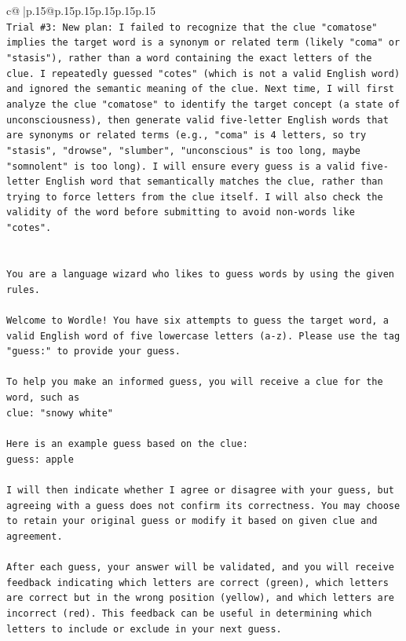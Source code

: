 \documentclass{article}
\begin{document}
{\begin{supertabular}{c@{$\;$}|p{.15\linewidth}@{}p{.15\linewidth}p{.15\linewidth}p{.15\linewidth}p{.15\linewidth}p{.15\linewidth}}
{{{\\ 
\texttt{Trial \#3: New plan: I failed to recognize that the clue "comatose" implies the target word is a synonym or related term (likely "coma" or "stasis"), rather than a word containing the exact letters of the clue. I repeatedly guessed "cotes" (which is not a valid English word) and ignored the semantic meaning of the clue. Next time, I will first analyze the clue "comatose" to identify the target concept (a state of unconsciousness), then generate valid five{-}letter English words that are synonyms or related terms (e.g., "coma" is 4 letters, so try "stasis", "drowse", "slumber", "unconscious" is too long, maybe "somnolent" is too long). I will ensure every guess is a valid five{-}letter English word that semantically matches the clue, rather than trying to force letters from the clue itself. I will also check the validity of the word before submitting to avoid non{-}words like "cotes".} \\
\\ 
\\ 
\texttt{You are a language wizard who likes to guess words by using the given rules.} \\
\\ 
\texttt{Welcome to Wordle! You have six attempts to guess the target word, a valid English word of five lowercase letters (a{-}z). Please use the tag "guess:" to provide your guess.} \\
\\ 
\texttt{To help you make an informed guess, you will receive a clue for the word, such as} \\
\texttt{clue: "snowy white"} \\
\\ 
\texttt{Here is an example guess based on the clue: } \\
\texttt{guess: apple} \\
\\ 
\texttt{I will then indicate whether I agree or disagree with your guess, but agreeing with a guess does not confirm its correctness. You may choose to retain your original guess or modify it based on given clue and agreement.} \\
\\ 
\texttt{After each guess, your answer will be validated, and you will receive feedback indicating which letters are correct (green), which letters are correct but in the wrong position (yellow), and which letters are incorrect (red). This feedback can be useful in determining which letters to include or exclude in your next guess.} \\
}}}
\end{supertabular}}
\end{document}
